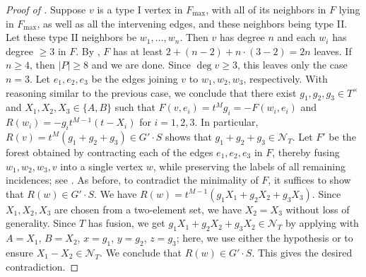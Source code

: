 \documentclass[reqno]{amsart}
\theoremstyle{definition}
\theoremstyle{remark}
\newcommand{\abs}[1]{\lvert #1 \rvert}
\newcommand{\Nc}{\mathcal{N}}
\begin{document}
\begin{proof}[Proof of ]
Suppose $v$ is a type I vertex in $F_{\max}$, with all of its neighbors in $F$ lying in $F_{\max}$, as well as all the intervening edges, and these neighbors being type II.
Let these type II neighbors be $w_1, \dots, w_n$.
Then $v$ has degree $n$ and each $w_i$ has degree $\geq 3$ in $F$. By , $F$ has at least $2 + (n - 2) + n \cdot (3 - 2) = 2n$ leaves.
If $n \geq 4$, then $\abs{P} \geq 8$ and we are done.
Since $\deg v \geq 3$, this leaves only the case $n = 3$. Let $e_1, e_2, e_3$ be the edges joining $v$ to $w_1, w_2, w_3$, respectively. With reasoning similar to the previous case, we conclude that there exist $g_1, g_2, g_3 \in T^{\times}$ and
$X_1, X_2, X_3 \in \{A, B\}$ such that 
$F(v, e_i) = t^{M} g_i = - F(w_i, e_i)$ and 
$R(w_i) = -g_i t^{M-1}(t - X_i)$ for $i = 1,2,3$.
In particular, $R(v) = t^M(g_1 + g_2 + g_3) \in G' \cdot S$ shows that $g_1 + g_2 + g_3 \in \Nc_T$.
Let $F'$ be the forest obtained by contracting each of the edges $e_1, e_2, e_3$ in $F$, thereby fusing $w_1, w_2, w_3, v$ into a single vertex $w$, while preserving the labels of all remaining incidences; see . As before, to contradict the minimality of $F$, it suffices to show that $R(w) \in G' \cdot S$. We have $R(w) = t^{M-1}(g_1 X_1 + g_2 X_2 + g_3 X_3)$. Since $X_1, X_2, X_3$ are chosen from a two-element set, we have $X_2 = X_3$ without loss of generality.
Since $T$ has fusion, we get
$g_1 X_1 + g_2 X_2 + g_3 X_2 \in \Nc_T$ by applying  with $A = X_1$, $B = X_2$, $x = g_1$, $y = g_2$, $z = g_3$; here, we use either the hypothesis or  to ensure $X_1 - X_2 \in \Nc_T$. We conclude that
$R(w) \in G' \cdot S$.
This gives the desired contradiction.
\end{proof}
\end{document}
